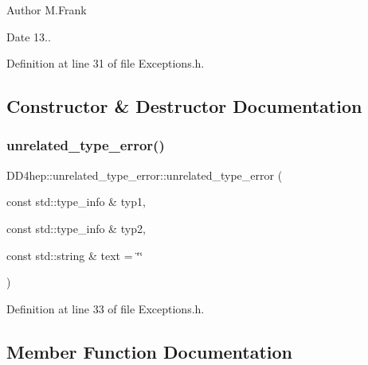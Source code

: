 \begin{DoxyAuthor}{Author}
M.\+Frank 
\end{DoxyAuthor}
\begin{DoxyDate}{Date}
13.. 
\end{DoxyDate}


Definition at line 31 of file Exceptions.\+h.



\subsection{Constructor \& Destructor Documentation}
\hypertarget{struct_d_d4hep_1_1unrelated__type__error_a53f8227fa75c1552d30b3d43e104a2ba}{}\label{struct_d_d4hep_1_1unrelated__type__error_a53f8227fa75c1552d30b3d43e104a2ba} 
\subsubsection{\texorpdfstring{unrelated\+\_\+type\+\_\+error()}{unrelated\_type\_error()}}
{\footnotesize\ttfamily D\+D4hep\+::unrelated\+\_\+type\+\_\+error\+::unrelated\+\_\+type\+\_\+error (\begin{DoxyParamCaption}\item[{const std\+::type\+\_\+info \&}]{typ1,  }\item[{const std\+::type\+\_\+info \&}]{typ2,  }\item[{const std\+::string \&}]{text = {\ttfamily \char`\"{}\char`\"{}} }\end{DoxyParamCaption})\hspace{0.3cm}{\ttfamily [inline]}}



Definition at line 33 of file Exceptions.\+h.



\subsection{Member Function Documentation}
\hypertarget{struct_d_d4hep_1_1unrelated__type__error_ab9b27edef2998895e04ccda3a241da29}{}\label{struct_d_d4hep_1_1unrelated__type__error_ab9b27edef2998895e04ccda3a241da29} 
